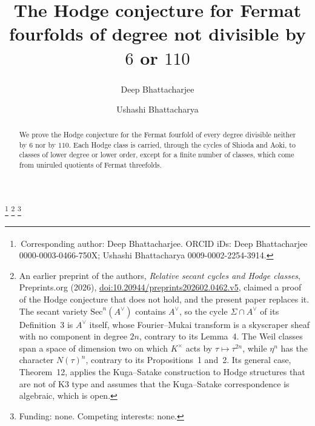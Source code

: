 \documentclass[11pt]{amsart}
\theoremstyle{definition}
\theoremstyle{remark}
\begin{document}
\title[The Hodge conjecture for Fermat fourfolds]{The Hodge conjecture for
Fermat fourfolds of degree not divisible by $6$ or $110$}

\author{Deep Bhattacharjee\textsuperscript{\dag}}
\address{Formerly, Electro-Gravitational Space Propulsion Laboratory (EGSPL),
\newline Bhubaneswar, Odisha 751030, India}
\address{Formerly, University of Calcutta, Senate House, 87/1 College Street,
\newline Kolkata 700073, West Bengal, India}
\author{Ushashi Bhattacharya}
\address{Formerly, National Taiwan University, Taipei 106319, Taiwan}
\thanks{\textsuperscript{\dag}\,Corresponding author: Deep Bhattacharjee.
ORCID iDs: Deep Bhattacharjee 0000-0003-0466-750X; Ushashi Bhattacharya
0009-0002-2254-3914.}
\thanks{An earlier preprint of the authors, \emph{Relative secant cycles and
Hodge classes}, Preprints.org (2026),
\href{https://doi.org/10.20944/preprints202602.0462.v5}{doi:10.20944/preprints202602.0462.v5},
claimed a proof of the Hodge conjecture that does not hold, and the present
paper replaces it. The secant variety $\mathrm{Sec}^{n}(A^{\vee})$ contains
$A^{\vee}$, so the cycle $\Sigma\cap A^{\vee}$ of its Definition~3 is
$A^{\vee}$ itself, whose Fourier--Mukai transform is a skyscraper sheaf with
no component in degree $2n$, contrary to its Lemma~4. The Weil classes span a
space of dimension two on which $K^{\times}$ acts by $\tau\mapsto\tau^{2n}$,
while $\eta^{n}$ has the character $N(\tau)^{n}$, contrary to its
Propositions~1 and~2. Its general case, Theorem~12, applies the Kuga--Satake
construction to Hodge structures that are not of K3 type and assumes that the
Kuga--Satake correspondence is algebraic, which is open.}
\thanks{Funding: none. Competing interests: none.}


\begin{abstract}
We prove the Hodge conjecture for the Fermat fourfold of every degree
divisible neither by $6$ nor by $110$. Each Hodge class is carried, through the cycles of Shioda
and Aoki, to classes of lower degree or lower order, except for a finite
number of classes, which come from uniruled quotients of Fermat threefolds.
\end{abstract}

\maketitle















\end{document}

